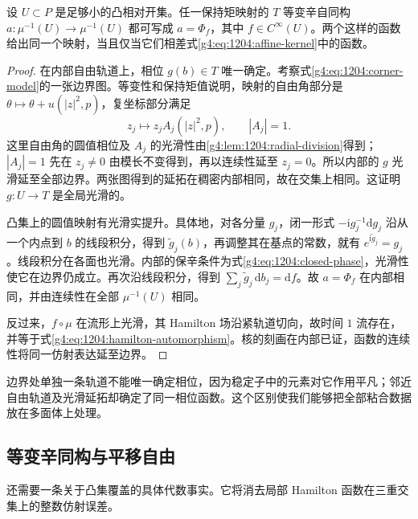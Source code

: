 \begin{proposition}\label{g4:prop:1204:boundary-automorphisms}
	设 \(U\subset P\) 是足够小的凸相对开集。任一保持矩映射的 \(T\) 等变辛自同构 \(a:\mu^{-1}(U)\to\mu^{-1}(U)\) 都可写成 \(a=\Phi_f\)，其中 \(f\in C^\infty(U)\)。两个这样的函数给出同一个映射，当且仅当它们相差式\eqref{g4:eq:1204:affine-kernel}中的函数。
\end{proposition}
\begin{proof}
	在内部自由轨道上，相位 \(g(b)\in T\) 唯一确定。考察式\eqref{g4:eq:1204:corner-model}的一张边界图。等变性和保持矩值说明，映射的自由角部分是 \(\theta\mapsto\theta+u(|z|^2,p)\)，复坐标部分满足
	\[
		z_j\longmapsto z_j A_j(|z|^2,p),\qquad |A_j|=1.
	\]
	这里自由角的圆值相位及 \(A_j\) 的光滑性由\cref{g4:lem:1204:radial-division}得到；\(|A_j|=1\) 先在 \(z_j\ne0\) 由模长不变得到，再以连续性延至 \(z_j=0\)。所以内部的 \(g\) 光滑延至全部边界。两张图得到的延拓在稠密内部相同，故在交集上相同。这证明 \(g:U\to T\) 是全局光滑的。

	凸集上的圆值映射有光滑实提升。具体地，对各分量 \(g_j\)，闭一形式 \(-\mathrm{i}g_j^{-1}\mathrm{d}g_j\) 沿从一个内点到 \(b\) 的线段积分，得到 \(\widetilde g_j(b)\)，再调整其在基点的常数，就有 \(e^{\mathrm{i}\widetilde g_j}=g_j\)。线段积分在各面也光滑。内部的保辛条件为式\eqref{g4:eq:1204:closed-phase}，光滑性使它在边界仍成立。再次沿线段积分，得到 \(\sum_j\widetilde g_j\,\mathrm{d}b_j=\mathrm{d}f\)。故 \(a=\Phi_f\) 在内部相同，并由连续性在全部 \(\mu^{-1}(U)\) 相同。

	反过来，\(f\circ\mu\) 在流形上光滑，其 Hamilton 场沿紧轨道切向，故时间 \(1\) 流存在，并等于式\eqref{g4:eq:1204:hamilton-automorphism}。核的刻画在内部已证，函数的连续性将同一仿射表达延至边界。
\end{proof}

边界处单独一条轨道不能唯一确定相位，因为稳定子中的元素对它作用平凡；邻近自由轨道及光滑延拓却确定了同一相位函数。这个区别使我们能够把全部粘合数据放在多面体上处理。

\subsection{等变辛同构与平移自由}
\label{g4:subsec:1204:04}
还需要一条关于凸集覆盖的具体代数事实。它将消去局部 Hamilton 函数在三重交集上的整数仿射误差。

